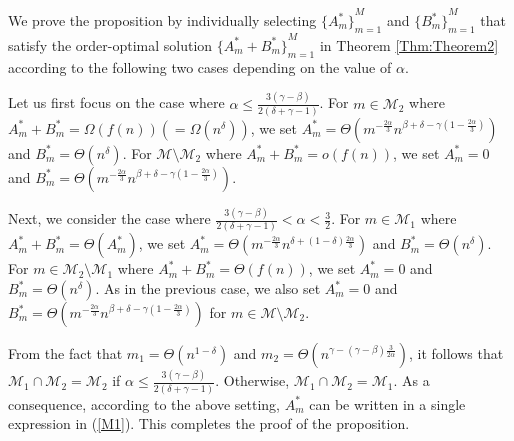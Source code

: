 \documentclass[10pt,journal,compsoc,onecolumn]{IEEEtran}
\begin{document}
\begin{IEEEproof}
We prove the proposition by individually selecting ${\lbrace A_m^* \rbrace}^M_{m=1}$ and ${\lbrace B_m^* \rbrace}^M_{m=1}$ that satisfy the order-optimal solution ${\lbrace A_m^*+B_m^* \rbrace}^M_{m=1}$ in Theorem \ref{Thm:Theorem2} according to the following two cases depending on the value of $\alpha$.\par
Let us first focus on the case where $\alpha \leq \frac{3(\gamma-\beta)}{2(\delta+\gamma-1)}$. For $m \in \mathcal{M}_2$ where $A_m^*+B_m^*=\Omega(f(n))\left(=\Omega\left(n^\delta\right)\right)$, we set $A_m^*=\Theta\left(m^{-\frac{2\alpha}{3}}n^{\beta+\delta-\gamma\left(1-\frac{2\alpha}{3}\right)}\right)$ and $B_m^*=\Theta\left(n^\delta\right)$. For $\mathcal{M}\setminus\mathcal{M}_2$ where $A_m^*+B_m^*=o(f(n))$, we set $A_m^*=0$ and $B_m^*=\Theta\left(m^{-\frac{2\alpha}{3}}n^{\beta+\delta-\gamma\left(1-\frac{2\alpha}{3}\right)}\right)$.   \par
Next, we consider the case where $\frac{3(\gamma-\beta)}{2(\delta+\gamma-1)}< \alpha<\frac{3}{2}$. For $m \in \mathcal{M}_1$ where $A_m^*+B_m^*=\Theta\left(A_m^*\right)$, we set $A_m^*=\Theta \left(m^{-\frac{2\alpha}{3}}n^{\delta+(1-\delta)\frac{2\alpha}{3}}\right)$ and $B_m^*=\Theta\left(n^\delta\right)$. For $m \in \mathcal{M}_2\setminus \mathcal{M}_1$ where $A_m^*+B_m^*=\Theta(f(n))$, we set $A_m^*=0$ and $B_m^*=\Theta\left(n^\delta\right)$. As in the previous case, we also set $A_m^*=0$ and $B_m^*=\Theta\left(m^{-\frac{2\alpha}{3}}n^{\beta+\delta-\gamma\left(1-\frac{2\alpha}{3}\right)}\right)$ for $m \in \mathcal{M}\setminus \mathcal{M}_2$.  \par
From the fact that $m_1=\Theta\left(n^{1-\delta}\right)$ and $m_2=\Theta\left(n^{\gamma-(\gamma-\beta)\frac{3}{2\alpha}}\right)$, it follows that $\mathcal{M}_1\cap\mathcal{M}_2=\mathcal{M}_2$ if $\alpha \leq \frac{3(\gamma-\beta)}{2(\delta+\gamma-1)}$. Otherwise, $\mathcal{M}_1\cap\mathcal{M}_2=\mathcal{M}_1$. As a consequence, according to the above setting, $A_m^*$ can be written in a single expression in (\ref{M1}). This completes the proof of the proposition.
\end{IEEEproof}
\end{document}
